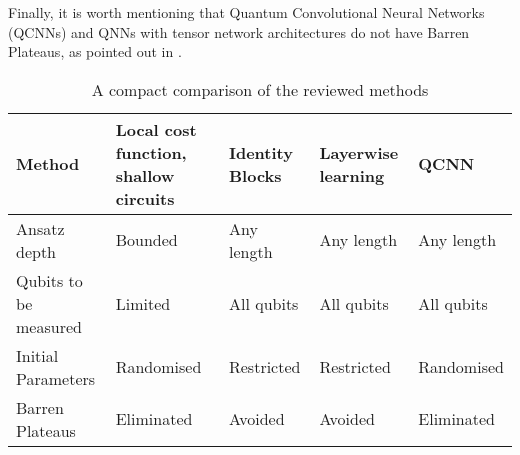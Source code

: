 Finally, it is worth mentioning that Quantum Convolutional Neural Networks (QCNNs) and QNNs with tensor network architectures do not have Barren Plateaus, as pointed out in \cite{congQuantumConvolutionalNeural2019}.

\begin{table}[]
    \centering
    \begin{tabular}{|p{3cm}|p{2cm}|p{2cm}|p{2cm}|p{2cm}|}
        \hline
        Method              & Local cost function, shallow circuits & Identity Blocks   & Layerwise learning    & QCNN \\
        \hline
        Ansatz depth        & Bounded                               & Any length        & Any length            & Any length \\
        \hline
        Qubits to be measured    & Limited                          & All qubits        & All qubits            & All qubits \\
        \hline
        Initial Parameters  & Randomised                            & Restricted        & Restricted            & Randomised \\
        \hline
        Barren Plateaus     & Eliminated                            & Avoided           & Avoided               & Eliminated \\
        \hline
    \end{tabular}
    \caption{A compact comparison of the reviewed methods}
    \label{quick comparison of methods}
\end{table}